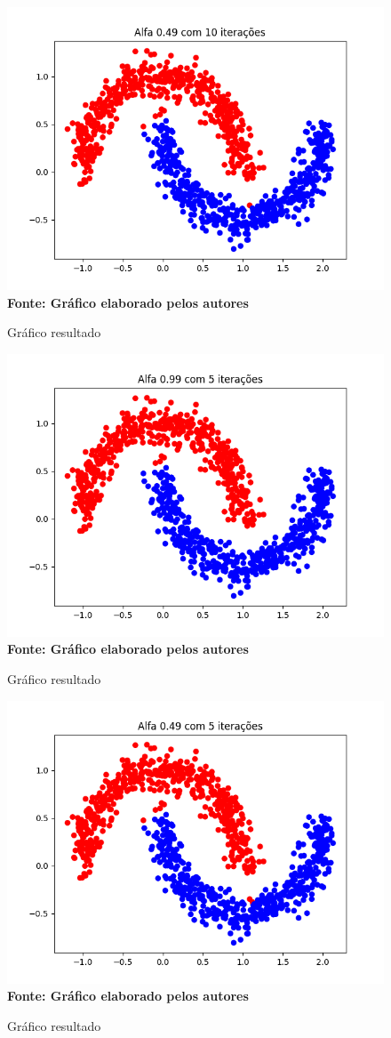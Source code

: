 \documentclass[12pt]{article}
\begin{document}
\begin{figure}[ht]
	\centering	
	\caption[\hspace{0.1cm}Gráfico Acurácia.]{Gráfico resultado}
	\vspace{-0.4cm}
	\includegraphics[width=.6\textwidth]{10_049.png}
	\\\textbf{\footnotesize  Fonte: Gráfico elaborado pelos autores }
	\label{fig:figura1}
\end{figure}

\newpage

\begin{figure}[ht]
	\centering	
	\caption[\hspace{0.1cm}Gráfico Acurácia.]{Gráfico resultado}
	\vspace{-0.4cm}
	\includegraphics[width=.6\textwidth]{5_099.png}
	\\\textbf{\footnotesize  Fonte: Gráfico elaborado pelos autores }
	\label{fig:figura1}
\end{figure}

\begin{figure}[ht]
	\centering	
	\caption[\hspace{0.1cm}Gráfico Acurácia.]{Gráfico resultado}
	\vspace{-0.4cm}
	\includegraphics[width=.6\textwidth]{5_049.png}
	\\\textbf{\footnotesize  Fonte: Gráfico elaborado pelos autores }
	\label{fig:figura1}
\end{figure}
\end{document}
